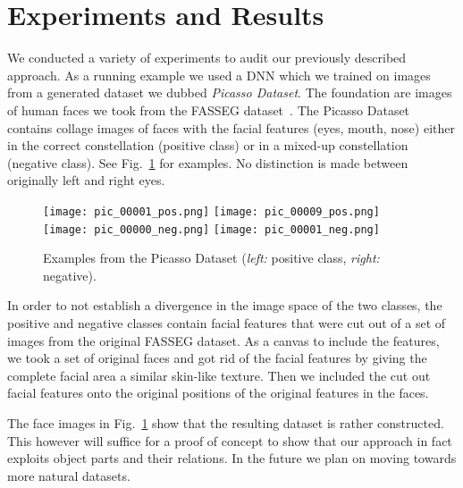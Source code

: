 \section{Experiments and Results}

We conducted a variety of experiments to audit our previously
described approach. As a running example we used a DNN which we
trained on images from a generated dataset we dubbed \emph{Picasso
  Dataset}. The foundation are images of human faces we took from the
FASSEG dataset~\cite{khan2015multi,khan2017head}.
The Picasso Dataset contains collage images of faces with the facial
features (eyes, mouth, nose) either in the correct constellation
(positive class) or in a mixed-up constellation (negative class). See
Fig.~\ref{fig:picasso} for examples.
No distinction is made between originally left and right eyes.

\begin{figure}
  \begin{center}
    \texttt{[image: pic\_00001\_pos.png]}\quad
    \texttt{[image: pic\_00009\_pos.png]}\qquad\qquad
    \texttt{[image: pic\_00000\_neg.png]}\quad
    \texttt{[image: pic\_00001\_neg.png]}
  \end{center}
  \caption{Examples from the Picasso Dataset
    (\textit{left:} positive class, \textit{right:} negative).}
  \label{fig:picasso}
\end{figure}

In order to not establish a divergence in the image space of the two
classes, the positive and negative classes contain facial features
that were cut out of a set of images from the original FASSEG
dataset. As a canvas to include the features, we took a set of
original faces and got rid of the facial features by giving the
complete facial area a similar skin-like texture. Then we included the
cut out facial features onto the original positions of the original
features in the faces.

The face images in Fig.~\ref{fig:picasso} show that
the resulting dataset is rather constructed. This however will suffice for
a proof of concept to show that our approach in fact exploits object parts
and their relations. In the future we plan on moving towards more natural
datasets.

